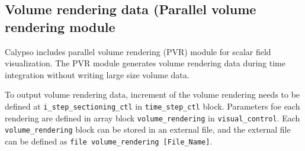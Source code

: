 \subsection{Volume rendering data (Parallel volume rendering module}

Calypso includes parallel volume rendering (PVR) module for scalar field visualization. The PVR module generates volume rendering data during time integration without writing large size volume data.

To output volume rendering data, increment of the volume rendering needs to be defined at \verb|i_step_sectioning_ctl| in \verb|time_step_ctl| block. Parameters foe each rendering are defined in array block \verb|volume_rendering| in \verb|visual_control|. Each  \verb|volume_rendering| block can be stored in an external file, and the external file can be defined as \verb|file volume_rendering [File_Name]|.

